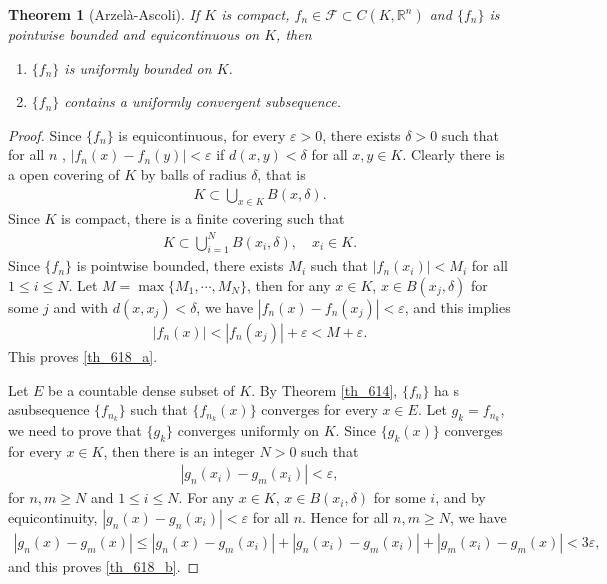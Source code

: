 \documentclass[10pt]{book}
\newtheorem{theorem}{Theorem}[chapter]
\theoremstyle{definition}
\numberwithin{equation}{chapter}
\begin{document}
\begin{theorem}[Arzelà-Ascoli]\label{th_618}
If $K$ is compact, $f_n \in \mathcal{F} \subset C(K,\mathbb{R}^n)$ and $\{f_n\}$ is pointwise bounded and equicontinuous on $K$, then
\begin{enumerate}[label=(\alph*)]
    \item $\{f_n\}$ is uniformly bounded on $K$. \label{th_618_a}
    
    \item $\{f_n\}$ contains a uniformly convergent subsequence. \label{th_618_b}
\end{enumerate}
\end{theorem}
\begin{proof}
Since $\{f_n\}$ is equicontinuous, for every $\varepsilon > 0$, there exists $\delta > 0$ such that for all $n$ , $\left|f_n(x) - f_n(y)\right| < \varepsilon$ if $d(x,y) < \delta$ for all $x,y \in K$. Clearly there is a open covering of $K$ by balls of radius $\delta$, that is
\begin{align*}
    K \subset \bigcup_{x \in K} B(x,\delta).
\end{align*}
Since $K$ is compact, there is a finite covering such that
\begin{align*}
    K \subset \bigcup^N_{i=1} B(x_i,\delta), \quad x_i \in K.
\end{align*}
Since $\{f_n\}$ is pointwise bounded, there exists $M_i$ such that $\left|f_n(x_i)\right| < M_i$ for all $1 \leq i \leq N$. Let $M = \max \{M_1, \cdots, M_N\}$, then for any $x \in K$, $x \in B(x_j,\delta)$ for some $j$ and with $d(x,x_j) < \delta$, we have $\left|f_n(x) - f_n(x_j)\right| < \varepsilon$, and this implies
\begin{align*}
    \left|f_n(x)\right| < \left|f_n(x_j)\right| + \varepsilon < M + \varepsilon.
\end{align*}
This proves \ref{th_618_a}.

Let $E$ be a countable dense subset of $K$. By Theorem \ref{th_614}, $\{f_n\}$ ha s asubsequence $\{f_{n_k}\}$ such that $\{f_{n_k}(x)\}$ converges for every $x \in E$. Let $g_k = f_{n_k}$, we need to prove that $\{g_k\}$ converges uniformly on $K$. Since $\{g_k(x)\}$ converges for every $x \in K$, then there is an integer $N > 0$ such that
\begin{align*}
    \left|g_n(x_i) - g_m(x_i)\right| < \varepsilon,
\end{align*}
for $n,m \geq N$ and $1 \leq i \leq N$. For any $x \in K$, $x \in B(x_i,\delta)$ for some $i$, and by equicontinuity, $\left|g_n(x) - g_n(x_i)\right| < \varepsilon$ for all $n$. Hence for all $n,m \geq N$, we have
\begin{align*}
    \left|g_n(x) - g_m(x)\right| \leq \left|g_n(x) - g_m(x_i)\right| + \left|g_n(x_i) - g_m(x_i)\right| + \left|g_m(x_i) - g_m(x)\right| < 3 \varepsilon,
\end{align*}
and this proves \ref{th_618_b}.
\end{proof}
\end{document}
